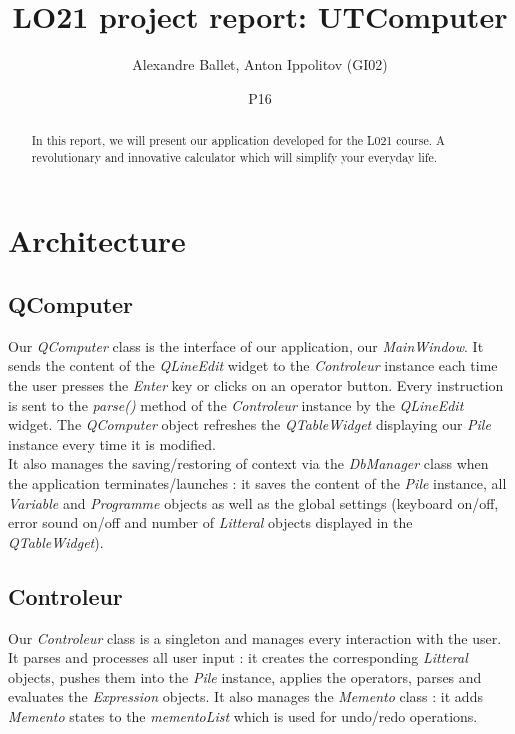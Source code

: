 \documentclass[titlepage]{article}
\begin{document}
\title{LO21 project report: UTComputer}
\author{Alexandre Ballet, Anton Ippolitov (GI02)}
\date{P16}
\maketitle

\tableofcontents

\begin{abstract}
In this report, we will present our application developed for the L021 course. A revolutionary and innovative calculator which will simplify your everyday life.
\end{abstract}

\section{Architecture}

    \subsection{QComputer}

    Our \textit{QComputer} class is the interface of our application, our \textit{MainWindow}. It sends the content of the \textit{QLineEdit} widget to the \textit{Controleur} instance each time the user presses the \textit{Enter} key or clicks on an operator button. Every instruction is sent to the \textit{parse()} method of the \textit{Controleur} instance by the \textit{QLineEdit} widget. The \textit{QComputer} object refreshes the \textit{QTableWidget} displaying our \textit{Pile} instance every time it is modified.\\
    It also manages the saving/restoring of context via the \textit{DbManager} class when the application terminates/launches : it saves the content of the \textit{Pile} instance, all \textit{Variable} and \textit{Programme} objects as well as the global settings (keyboard on/off, error sound on/off and number of \textit{Litteral} objects displayed in the \textit{QTableWidget}).\\

    \subsection{Controleur}

    Our \textit{Controleur} class is a singleton and manages every interaction with the user. It parses and processes all user input : it creates the corresponding \textit{Litteral} objects, pushes them into the \textit{Pile} instance, applies the operators, parses and evaluates the \textit{Expression} objects. It also manages the \textit{Memento} class : it adds \textit{Memento} states to the \textit{mementoList} which is used for undo/redo operations.\\
\end{document}
